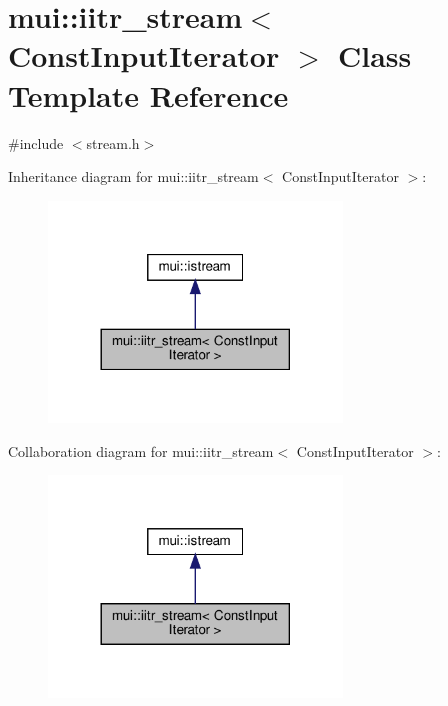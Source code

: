 \hypertarget{classmui_1_1iitr__stream}{}\section{mui\+:\+:iitr\+\_\+stream$<$ Const\+Input\+Iterator $>$ Class Template Reference}
\label{classmui_1_1iitr__stream}


{\ttfamily \#include $<$stream.\+h$>$}



Inheritance diagram for mui\+:\+:iitr\+\_\+stream$<$ Const\+Input\+Iterator $>$\+:
\nopagebreak
\begin{figure}[H]
\begin{center}
\leavevmode
\includegraphics[width=221pt]{classmui_1_1iitr__stream__inherit__graph}
\end{center}
\end{figure}


Collaboration diagram for mui\+:\+:iitr\+\_\+stream$<$ Const\+Input\+Iterator $>$\+:
\nopagebreak
\begin{figure}[H]
\begin{center}
\leavevmode
\includegraphics[width=221pt]{classmui_1_1iitr__stream__coll__graph}
\end{center}
\end{figure}

